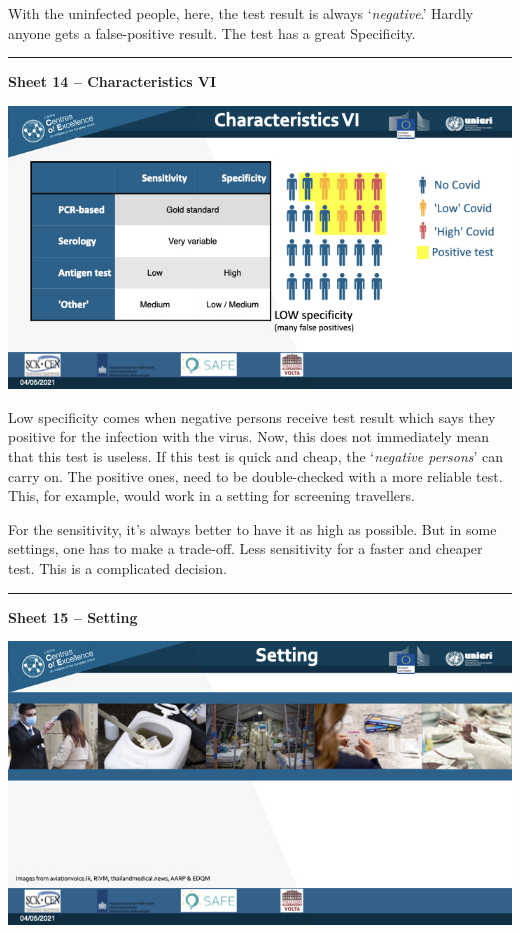 \documentclass[
]{book}
\begin{document}
With the uninfected people, here, the test result is always
`\emph{negative}.' Hardly anyone gets a
false-positive result. The test has a great Specificity.

\begin{center}\rule{0.5\linewidth}{0.5pt}\end{center}

\textbf{Sheet 14 -- Characteristics VI}

\includegraphics{images/m02/m02_types_of_rapid_tests_final.014.jpeg}

Low specificity comes when negative persons receive test result which
says they positive for the infection with the virus. Now, this does not
immediately mean that this test is useless. If this test is quick and
cheap, the `\emph{negative persons}' can carry on.
The positive ones, need to be double-checked with a more reliable test.
This, for example, would work in a setting for screening travellers.

For the sensitivity, it's always better to have it as high
as possible. But in some settings, one has to make a trade-off. Less
sensitivity for a faster and cheaper test. This is a complicated
decision.

\begin{center}\rule{0.5\linewidth}{0.5pt}\end{center}

\textbf{Sheet 15 -- Setting}

\includegraphics{images/m02/m02_types_of_rapid_tests_final.015.jpeg}
\end{document}
